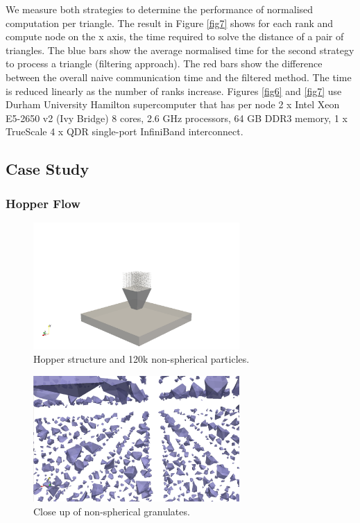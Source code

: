 \documentclass[times,12pt]{article}
\begin{document}
We measure both strategies to determine the performance of normalised computation per triangle. The result in Figure \ref{fig7} shows for each rank and compute node on the x axis, the time required to solve the distance of a pair of triangles. The blue bars show the average normalised time for the second strategy to process a triangle (filtering approach). The red bars show the difference between the overall naive communication time and the filtered method. The time is reduced linearly as the number of ranks increase. Figures \ref{fig6} and \ref{fig7} use Durham University Hamilton supercomputer that has per node 2 x Intel Xeon E5-2650 v2 (Ivy Bridge) 8 cores, 2.6 GHz processors, 64 GB DDR3 memory, 1 x TrueScale 4 x QDR single-port InfiniBand interconnect.

\subsection{Case Study}


\subsubsection{Hopper Flow}

\begin{figure}[!h]
\centering
\includegraphics[width=0.7\textwidth]{sketches/hopper} \protect\caption{\label{hopper} Hopper structure and 120k non-spherical particles.}
\end{figure}

\begin{figure}[!h]
\centering
\includegraphics[width=0.7\textwidth]{sketches/granulatecloseup} \protect\caption{\label{hoppercloseup}Close up of non-spherical granulates.}
\end{figure}
\end{document}
